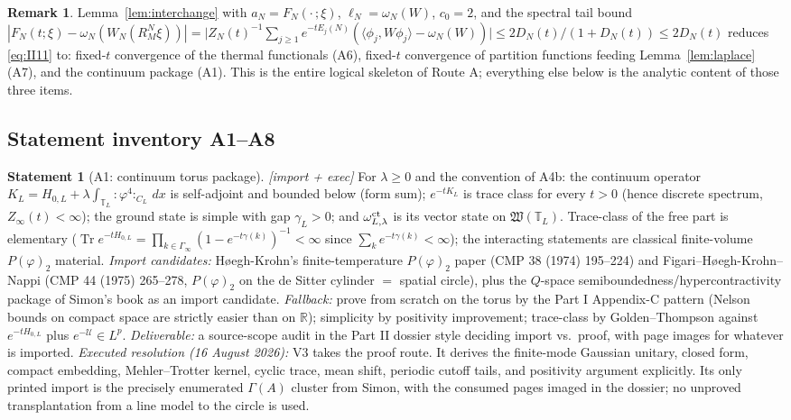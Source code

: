 \documentclass[11pt,a4paper]{article}
\theoremstyle{plain}
\theoremstyle{definition}
\newtheorem{remark}[theorem]{Remark}
\newtheorem{statement}[theorem]{Statement}
\newcommand{\R}{\mathbb{R}}
\newcommand{\T}{\mathbb{T}}
\newcommand{\W}{\mathfrak{W}}
\newcommand{\ip}[2]{\langle #1,#2\rangle}
\DeclareMathOperator{\Trace}{Tr}
\begin{document}
\begin{remark}
Lemma~\ref{lem:interchange} with $a_N=F_N(\cdot\,;\xi)$, $\ell_N=\omega_N(W)$,
$c_0=2$, and the spectral tail bound
$|F_N(t;\xi)-\omega_N(W_N(R_M^N\xi))|
=\bigl|Z_N(t)^{-1}\sum_{j\ge1}e^{-tE_j(N)}(\ip{\phi_j}{W\phi_j}-\omega_N(W))\bigr|
\le2D_N(t)/(1+D_N(t))\le2D_N(t)$
reduces \eqref{eq:II11} to: fixed-$t$ convergence of the thermal functionals
(A6), fixed-$t$ convergence of partition functions feeding
Lemma~\ref{lem:laplace} (A7), and the continuum package (A1). This is the entire
logical skeleton of Route A; everything else below is the analytic content of those
three items.
\end{remark}

\subsection{Statement inventory A1--A8}

\begin{statement}[A1: continuum torus package]\label{st:A1}
\emph{[import + exec]} For $\lambda\ge0$ and the convention of A4b: the continuum
operator $K_L=H_{0,L}+\lambda\int_{\T_L}{:}\varphi^4{:}_{C_L}\,dx$ is self-adjoint and
bounded below (form sum); $e^{-tK_L}$ is trace class for every $t>0$ (hence discrete
spectrum, $Z_\infty(t)<\infty$); the ground state is simple with gap
$\gamma_L>0$; and $\omega^{\rm ct}_{L,\lambda}$ is its vector state on
$\W(\T_L)$. Trace-class of the free part is elementary
($\Trace e^{-tH_{0,L}}=\prod_{k\in\Gamma_\infty}(1-e^{-t\gamma(k)})^{-1}<\infty$
since $\sum_ke^{-t\gamma(k)}<\infty$); the interacting statements are classical
finite-volume $P(\varphi)_2$ material. \emph{Import candidates:}
H{\o}egh-Krohn's finite-temperature $P(\varphi)_2$ paper (CMP 38 (1974) 195--224) and
Figari--H{\o}egh-Krohn--Nappi (CMP 44 (1975) 265--278, $P(\varphi)_2$ on the de Sitter
cylinder $=$ spatial circle), plus the $Q$-space semiboundedness/hypercontractivity
package of Simon's book as an import candidate. \emph{Fallback:} prove from scratch on
the torus by the Part I Appendix-C pattern (Nelson bounds on compact space are
strictly easier than on $\R$); simplicity by positivity improvement; trace-class by
Golden--Thompson against $e^{-tH_{0,L}}$ plus $e^{-\mathcal U}\in L^p$.
\emph{Deliverable:} a source-scope audit in the Part II dossier style deciding
import vs.\ proof, with page images for whatever is imported.
\emph{Executed resolution (16 August 2026):} V3 takes the proof route.  It derives
the finite-mode Gaussian unitary, closed form, compact embedding, Mehler--Trotter
kernel, cyclic trace, mean shift, periodic cutoff tails, and positivity argument
explicitly.  Its only printed import is the precisely enumerated $\Gamma(A)$ cluster
from Simon, with the consumed pages imaged in the dossier; no unproved transplantation
from a line model to the circle is used.
\end{statement}
\end{document}
